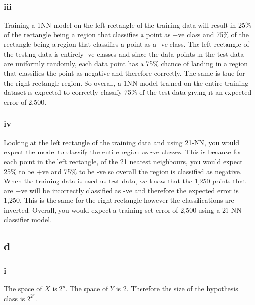 \documentclass{article}
\begin{document}
\subsubsection*{iii}

Training a 1NN model on the left rectangle of the training data will result in 25\% of the rectangle being a region that classifies a point as +ve class and 
75\% of the rectangle being a region that classifies a point as a -ve class. The left rectangle of the testing data is entirely -ve classes and 
since the data points in the test data are uniformly randomly, each data point has a
75\% chance of landing in a region that classifies the point as negative and therefore correctly. The same is true for the right rectangle region.
So overall, a 1NN model trained on the entire training dataset is expected to correctly classify 75\% of the test data giving it an expected error 
of 2,500.

\subsubsection*{iv}

Looking at the left rectangle of the training data and using 21-NN, you would expect the model to classify the entire region as -ve classes. 
This is because for each point in the left rectangle, of the 21 nearest neighbours, you would expect 25\% to be +ve and 75\% to be -ve so
overall the region is classified as negative. When the training data is used as test data, we know that the 1,250 points that are +ve will 
be incorrectly classified as -ve and therefore the expected error is 1,250. This is the same for the right rectangle however the classifications
are inverted. Overall, you would expect a training set error of 2,500 using a 21-NN classifier model.

\subsection*{d}

\subsubsection*{i}
The space of \(X\) is \(2^{p}\). The space of \(Y\) is 2. Therefore the size of the hypothesis class is \(2^{2^{p}}\).
\end{document}
